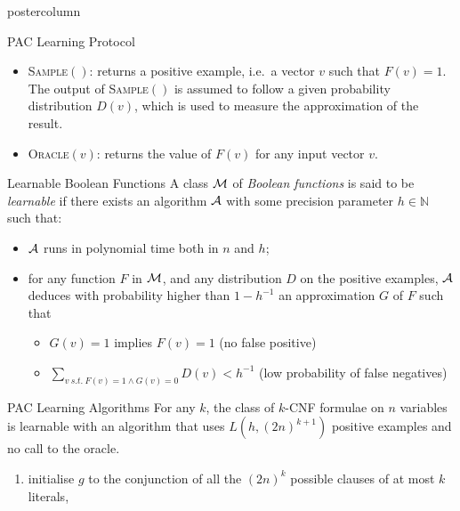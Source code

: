 \documentclass[final,hyperref={pdfpagelabels=false},xcolor=dvipsnames]{beamer}
\begin{document}
\begin{frame}[fragile]
\begin{columns}
\begin{column}{.49\textwidth}
\begin{beamercolorbox}[center,wd=\textwidth]{postercolumn}
\begin{minipage}[T]{.95\textwidth}
{\begin{block}{PAC Learning Protocol}
\begin{itemize}
  \item
\textsc{Sample}$()$: returns a positive example, i.e.~a vector $v$ such that $F(v)=1$.
The output of \textsc{Sample}$()$ is assumed to follow a given probability distribution $D(v)$, which is used to measure the approximation of the result.
  \item
\textsc{Oracle}$(v)$: returns the value of $F(v)$ for any input vector $v$.
\end{itemize}
            \end{block}
            \vfill
            \begin{block}{Learnable Boolean Functions}
   A class $\cal M$ of \emph{Boolean functions} is said to be \emph{learnable}
   if there exists an algorithm $\cal A$ with some precision parameter $h\in\mathbb N$ such that:
   \begin{itemize}
      \item $\cal A$ runs in polynomial time both in $n$ and $h$;
      \item
         for any function $F$ in $\cal M$, and any distribution $D$ on the positive examples,
         $\cal A$ deduces with probability higher than $1-h^{-1}$ an approximation $G$ of $F$ such that
         \begin{itemize}
            \item $G(v)=1$ implies $F(v)=1$ (no false positive)
            \item
               $\displaystyle\sum_{v\ s.t.\ F(v)=1\wedge G(v)=0} D(v) < h^{-1}$ (low probability of false negatives)
         \end{itemize}
   \end{itemize}
            \end{block}
            \vfill
            \begin{block}{PAC Learning Algorithms \cite{Valiant84cacm}}
For any $k$, the class of $k$-CNF formulae on $n$ variables is learnable with an
algorithm that uses $L(h,{(2 n)}^{k+1})$ positive examples and no call to the
oracle.
\begin{enumerate}
  \item initialise $g$ to the conjunction of all the $(2n)^k$ possible clauses of at most $k$ literals,

\end{enumerate}
\end{block}}
\end{minipage}
\end{beamercolorbox}
\end{column}
\end{columns}
\end{frame}
\end{document}
